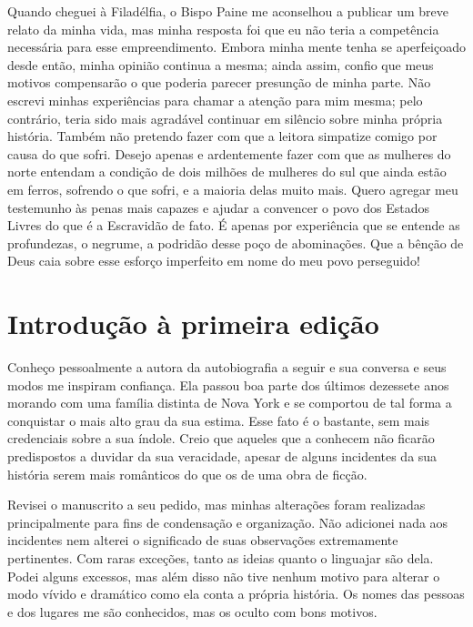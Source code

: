Quando cheguei à Filadélfia, o Bispo
Paine me aconselhou a publicar um breve relato da minha vida, mas minha
resposta foi que eu não teria a competência necessária para esse
empreendimento. Embora minha mente tenha se aperfeiçoado desde então, minha
opinião continua a mesma; ainda assim, confio que meus motivos
compensarão o que poderia parecer presunção de minha parte. Não escrevi
minhas experiências para chamar a atenção para mim mesma; pelo
contrário, teria sido mais agradável continuar em silêncio sobre minha
própria história. Também não pretendo fazer com que a leitora simpatize
comigo por causa do que sofri. Desejo apenas e ardentemente fazer com
que as mulheres do norte entendam a condição de dois milhões de mulheres
do sul que ainda estão em ferros, sofrendo o que sofri, e a maioria
delas muito mais. Quero agregar meu testemunho às penas mais capazes e
ajudar a convencer o povo dos Estados Livres do que é a Escravidão de
fato. É apenas por experiência que se entende as profundezas, o negrume,
a podridão desse poço de abominações. Que a bênção de Deus caia sobre
esse esforço imperfeito em nome do meu povo perseguido!

\chapter*{Introdução à primeira edição}

\begin{flushright}
\end{flushright}

Conheço pessoalmente a autora da
autobiografia a seguir e sua conversa e seus modos me inspiram
confiança. Ela passou boa parte
dos últimos dezessete anos morando com uma família distinta de Nova York
e se comportou de tal forma a conquistar o mais alto grau da sua estima.
Esse fato é o bastante, sem mais credenciais sobre a sua índole. Creio
que aqueles que a conhecem não ficarão predispostos a duvidar da sua
veracidade, apesar de alguns incidentes da sua história serem mais
românticos do que os de uma obra de ficção.

Revisei o manuscrito a seu pedido, mas
minhas alterações foram realizadas principalmente para fins de
condensação e organização. Não adicionei nada aos incidentes nem alterei
o significado de suas observações extremamente pertinentes. Com raras
exceções, tanto as ideias quanto o linguajar são dela. Podei alguns
excessos, mas além disso não tive nenhum motivo para alterar o modo
vívido e dramático como ela conta a própria história. Os nomes das
pessoas e dos lugares me são conhecidos, mas os oculto com bons motivos.

